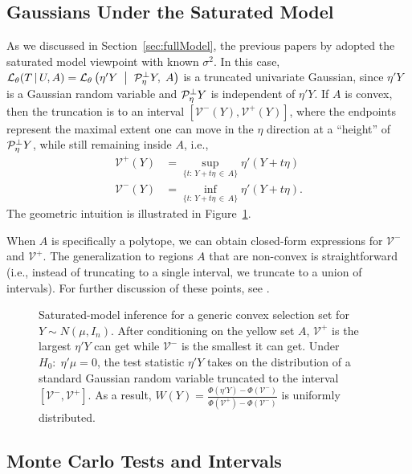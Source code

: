 \documentclass{article}
\theoremstyle{definition}
\newcommand{\cV}{\mathcal{V}}
\newcommand{\Gv}{\;\;\big|\;\;}
\newcommand{\proj}{\cP}
\newcommand{\cL}{\mathcal{L}}
\begin{document}
\subsection{Gaussians Under the Saturated Model}\label{sec:classifying}

As we discussed in Section~\ref{sec:fullModel}, the previous papers by \citet{lee2013exact,loftus2014significance,lee2014marginal} adopted the saturated model viewpoint with known $\sigma^2$. In this case, $\cL_\theta(T\gv U, A) = \cL_\theta\left( \eta'Y \Gv \proj_\eta^\perp Y, \; A\right)$ is a truncated univariate Gaussian, since $\eta' Y$ is a Gaussian random variable and $\proj_\eta^\perp Y$ is independent of $\eta' Y$. If $A$ is convex, then the truncation is to an interval $[\cV^-(Y), \cV^+(Y)]$, where the endpoints represent the maximal extent one can move in the $\eta$ direction at a ``height'' of $\proj_\eta^\perp Y$, while still remaining inside $A$, i.e.,
\begin{align}
  \cV^{+}(Y) &= \sup_{\{t:\,Y + t\eta \,\in\, A\}} \eta'(Y+t\eta)\\[5pt]
  \cV^{-}(Y) &= \inf_{\{t:\,Y + t\eta \,\in\, A\}} \eta'(Y+t\eta).
\end{align}
The geometric intuition is illustrated in Figure~\ref{fig:blob}.

When $A$ is specifically a polytope, we can obtain closed-form expressions for $\cV^-$ and $\cV^+$. The generalization to regions $A$ that are non-convex is straightforward (i.e., instead of truncating to a single interval, we truncate to a union of intervals). For further discussion of these points, see \citet{lee2013exact}.


 \begin{figure}
   \centering
 \def\svgwidth{0.4\textwidth}

   \caption{Saturated-model inference for a generic convex selection set for ${Y\sim N(\mu, I_n)}$. After conditioning on the yellow set $A$, $\cV^+$ is the largest $\eta'Y$ can get while $\cV^-$ is the smallest it can get. Under $H_0:\;\eta'\mu = 0$, the test statistic $\eta'Y$ takes on the distribution of a standard Gaussian random variable truncated to the interval $[\cV^-, \cV^+]$. As a result, $W(Y) = \frac{ \Phi(\eta'Y) - \Phi(\cV^-)}{ \Phi(\cV^+) - \Phi(\cV^-)}$ is uniformly distributed.}
   \label{fig:blob}
 \end{figure}


\subsection{Monte Carlo Tests and Intervals}\label{sec:monte}
\end{document}
